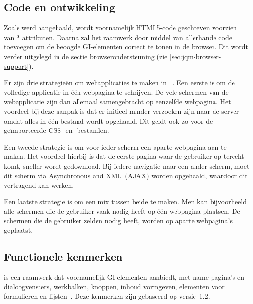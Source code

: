 \subsection{Code en ontwikkeling}
Zoals werd aangehaald, wordt voornamelijk HTML5-code geschreven voorzien van * attributen. 
Daarna zal het raamwerk door middel van  allerhande code toevoegen om de beoogde GI-elementen correct te tonen in de browser. 
Dit wordt verder uitgelegd in de sectie browserondersteuning (zie \ref{sec:jqm-browser-support}).

Er zijn drie strategieën om webapplicaties te maken in \jqm{}~\cite{Broulik2012}. 
Een eerste is om de volledige applicatie in één webpagina te schrijven. 
De vele schermen van de webapplicatie zijn dan allemaal samengebracht op eenzelfde webpagina. 
Het voordeel bij deze aanpak is dat er initieel minder verzoeken zijn naar de server omdat alles in één bestand wordt opgehaald. 
Dit geldt ook zo voor de geïmporteerde CSS- en \js{}-bestanden. 

Een tweede strategie is om voor ieder scherm een aparte webpagina aan te maken. 
Het voordeel hierbij is dat de eerste pagina waar de gebruiker op terecht komt, sneller wordt gedownload. 
Bij iedere navigatie naar een ander scherm, moet dit scherm via Asynchronous \js{} and XML~(AJAX) worden opgehaald, waardoor dit vertragend kan werken. 

Een laatste strategie is om een mix tussen beide te maken. 
Men kan bijvoorbeeld alle schermen die de gebruiker vaak nodig heeft op één webpagina plaatsen. 
De schermen die de gebruiker zelden nodig heeft, worden op aparte webpagina's geplaatst.   

\subsection{Functionele kenmerken}
\jqm{} is een raamwerk dat voornamelijk GI-elementen aanbiedt, met name pagina's en dialoogvensters, werkbalken, knoppen, inhoud vormgeven, elementen voor formulieren en lijsten~\cite{JQuery2012b}.
Deze kenmerken zijn gebaseerd op versie~1.2.

